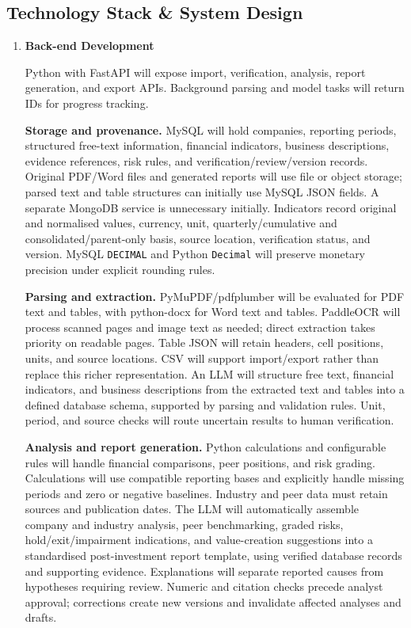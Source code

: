 \documentclass[a4paper,12pt]{article}
\begin{document}
\subsection{Technology Stack \& System Design}
\begin{enumerate}
  \item \textbf{Back-end Development}\par
  Python with FastAPI will expose import, verification, analysis, report
  generation, and export APIs. Background parsing and model tasks will return IDs for
  progress tracking.

  \noindent\textbf{Storage and provenance.}
  MySQL will hold companies, reporting periods, structured free-text
  information, financial indicators, business descriptions, evidence
  references, risk rules, and verification/review/version records. Original
  PDF/Word files and generated reports will use file or object storage;
  parsed text and table structures can initially use MySQL JSON fields.
  A separate MongoDB service is unnecessary initially. Indicators record
  original and normalised values,
  currency, unit, quarterly/cumulative and consolidated/parent-only basis,
  source location, verification status, and version. MySQL
  \texttt{DECIMAL} and Python \texttt{Decimal} will preserve monetary
  precision under explicit rounding rules.

  \noindent\textbf{Parsing and extraction.}
  PyMuPDF/pdfplumber will be evaluated for PDF text and tables, with
  python-docx for Word text and tables. PaddleOCR will process scanned pages
  and image text as needed; direct extraction takes priority on readable
  pages. Table JSON will retain headers, cell positions, units, and source
  locations. CSV will support import/export rather than replace this
  richer representation. An LLM will structure free text, financial
  indicators, and business descriptions from the extracted text and tables
  into a defined database schema, supported by parsing and validation rules.
  Unit, period, and source checks will route uncertain results to human
  verification.

  \noindent\textbf{Analysis and report generation.}
  Python calculations and configurable rules will handle financial
  comparisons, peer positions, and risk grading. Calculations will use
  compatible reporting bases and explicitly handle missing periods and
  zero or negative baselines. Industry and peer data must retain sources
  and publication dates. The LLM will automatically assemble company and
  industry analysis, peer benchmarking, graded risks, hold/exit/impairment
  indications, and value-creation suggestions into a standardised
  post-investment report template, using verified database records and
  supporting evidence. Explanations will separate reported causes from
  hypotheses requiring review. Numeric and citation checks precede
  analyst approval; corrections create new versions and invalidate affected
  analyses and drafts.


\end{enumerate}
\end{document}
